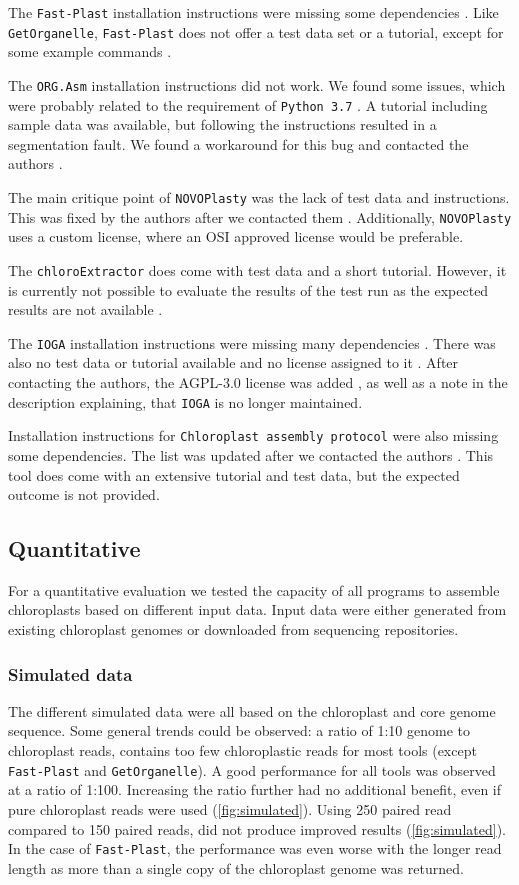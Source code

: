 \documentclass{bmcart}
\newcommand{\formatprogramnames}[1]{\texttt{#1}}
\newcommand{\ce}{\formatprogramnames{chloroExtractor}}
\newcommand{\oa}{\formatprogramnames{ORG.Asm}}
\newcommand{\fp}{\formatprogramnames{Fast-Plast}}
\newcommand{\ioga}{\formatprogramnames{IOGA}}
\newcommand{\np}{\formatprogramnames{NOVOPlasty}}
\newcommand{\go}{\formatprogramnames{GetOrganelle}}
\newcommand{\cassp}{\formatprogramnames{Chloroplast assembly protocol}}
\begin{document}
The \fp{} installation instructions were missing some dependencies \cite{fp_issue_33}. 
Like \go{}, \fp{} does not offer a test data set or a tutorial, except for some example commands \cite{go_issue_10}. 
%

The \oa{} installation instructions did not work.
We found some issues, which were probably related to the requirement of \texttt{Python~3.7}
\cite{oa_issue_59}.
A tutorial including sample data was available, but following the instructions resulted in a segmentation fault.
We found a workaround for this bug and contacted the authors \cite{oa_issue_57}.
%

The main critique point of \np{} was the lack of test data and instructions.
This was fixed by the authors after we contacted them \cite{np_issue_82}.
Additionally, \np{} uses a custom license, where an OSI approved license would be preferable.
%

The \ce{} does come with test data and a short tutorial.
However, it is currently not possible to evaluate the results of the test run as the expected results are not available \cite{ce_issue_139}.
%

The \ioga{} installation instructions were missing many dependencies \cite{ioga_issue_12}. There was also no test data or tutorial available and no license assigned to it \cite{ioga_issue_13}.
After contacting the authors, the AGPL-3.0 license was added \cite{ioga_issue_11}, as well as a note in the description explaining, that \ioga{} is no longer maintained. 

Installation instructions for \cassp{} were also missing some dependencies.
The list was updated after we contacted the authors \cite{cassp_issue_5}.
This tool does come with an extensive tutorial and test data, but the expected outcome is not provided.

\subsection*{Quantitative}
For a quantitative evaluation we tested the capacity of all programs to assemble chloroplasts based on different input data.
Input data were either generated from existing chloroplast genomes or downloaded from sequencing repositories. 

\subsubsection*{Simulated data}
The different simulated data were all based on the  chloroplast and core genome sequence.
Some general trends could be observed: a ratio of 1:10 genome to chloroplast reads,  contains too few chloroplastic reads for most tools (except \fp{} and \go{}). A good performance for all tools was observed at a ratio of 1:100.  Increasing the ratio further had no additional benefit, even if pure chloroplast reads were used (\cref{fig:simulated}).
Using \SI{250}{\basepair{}} paired read compared to \SI{150}{\basepair{}} paired reads, did not produce improved results (\cref{fig:simulated}).
In the case of \fp{}, the performance was even worse with the longer read length as more than a single copy of the chloroplast genome was returned.
\end{document}
